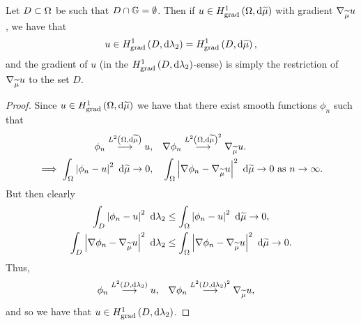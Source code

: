 \documentclass[11pt]{report}
\begin{document}
\begin{prop} \label{prop:MembershipSmallerDomains}
	Let $D\subset\Omega$ be such that $D\cap\mathbb{G} = \emptyset$.
	Then if $u\in H^1_\mathrm{grad}\left( \Omega, \mathrm{d}\widetilde{\mu} \right)$ with gradient $\nabla_{\widetilde{\mu}}u$, we have that
	\begin{align*}
		u\in H^1_\mathrm{grad}\left( D, \mathrm{d}\lambda_2 \right) = H^1_\mathrm{grad}\left( D, \mathrm{d}\widetilde{\mu} \right),
	\end{align*}
	and the gradient of $u$ (in the $H^1_\mathrm{grad}\left( D, \mathrm{d}\lambda_2 \right)$-sense) is simply the restriction of $\nabla_{\widetilde{\mu}}u$ to the set $D$.
\end{prop}
\begin{proof}
	Since $u\in H^1_\mathrm{grad}\left( \Omega, \mathrm{d}\widetilde{\mu} \right)$ we have that there exist smooth functions $\phi_n$ such that
	\begin{align*}
		\phi_n \overset{L^{2}\left( \Omega,\mathrm{d}\widetilde{\mu} \right)}{\longrightarrow} u, &\quad \nabla\phi_n \overset{L^{2}\left( \Omega,\mathrm{d}\widetilde{\mu} \right)^2}{\longrightarrow} \nabla_{\widetilde{\mu}}u. \\
		\implies \int_{\Omega}\left\lvert \phi_n-u \right\rvert^2 \ \mathrm{d}\widetilde{\mu} \rightarrow 0, 
		&\quad \int_{\Omega}\left\lvert \nabla\phi_n - \nabla_{\widetilde{\mu}}u \right\rvert^2 \ \mathrm{d}\widetilde{\mu} \rightarrow 0 \ \text{as} \ n \rightarrow\infty.
	\end{align*}
	But then clearly
	\begin{align*}
		\int_{D}\left\lvert \phi_n - u \right\rvert^2 \ \mathrm{d}\lambda_2 
		&\leq \int_{\Omega}\left\lvert \phi_n-u \right\rvert^2 \ \mathrm{d}\widetilde{\mu} \rightarrow 0, \\
		\int_{D}\left\lvert \nabla\phi_n - \nabla_{\widetilde{\mu}}u \right\rvert^2 \ \mathrm{d}\lambda_2 
		&\leq \int_{\Omega}\left\lvert \nabla\phi_n - \nabla_{\widetilde{\mu}}u \right\rvert^2 \ \mathrm{d}\widetilde{\mu} \rightarrow 0.
	\end{align*}
	Thus,
	\begin{align*}
		\phi_n \overset{L^{2}\left( D,\mathrm{d}\lambda_2 \right)}{\longrightarrow} u, &\quad \nabla\phi_n \overset{L^{2}\left( D,\mathrm{d}\lambda_2 \right)^2}{\longrightarrow} \nabla_{\widetilde{\mu}}u,
	\end{align*}
	and so we have that $u\in H^1_\mathrm{grad}\left( D, \mathrm{d}\lambda_2 \right)$.
\end{proof}
\end{document}
